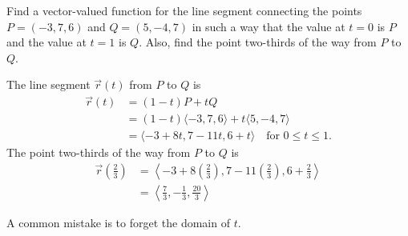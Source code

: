 \documentclass[handout]{ximera}
\begin{document}
\begin{problem}
Find a vector-valued function for the line segment connecting the points $P = (-3,7,6)$ and $Q = (5,-4,7)$ in such a way that the value at $t=0$ is $P$ and the value at $t=1$ is $Q$.  
Also, find the point two-thirds of the way from $P$ to $Q$.
	\begin{freeResponse}
	The line segment $\vec{r}(t)$ from $P$ to $Q$ is 
		\begin{align*}
		\vec{r}(t) &= (1-t)P + tQ  \\
		&= (1-t) \langle -3,7,6 \rangle + t \langle 5,-4,7 \rangle  \\
		&= \boxed{\langle -3 + 8t, 7 - 11t, 6 + t \rangle \quad \text{for }0 \leq t \leq 1}.
		\end{align*}
	The point two-thirds of the way from $P$ to $Q$ is
		\begin{align*}
		\vec{r} \left( \frac{2}{3} \right)
		&= \left\langle -3 + 8 \left( \frac{2}{3} \right), 7 - 11\left( \frac{2}{3} \right), 6 + \frac{2}{3} \right\rangle  \\
		&= \boxed{\left\langle \frac{7}{3} , - \frac{1}{3}, \frac{20}{3} \right\rangle}
		\end{align*}
	\end{freeResponse}
	
\begin{instructorNotes}
A common mistake is to forget the domain of $t$. 
\end{instructorNotes}
\end{problem}
\end{document}
